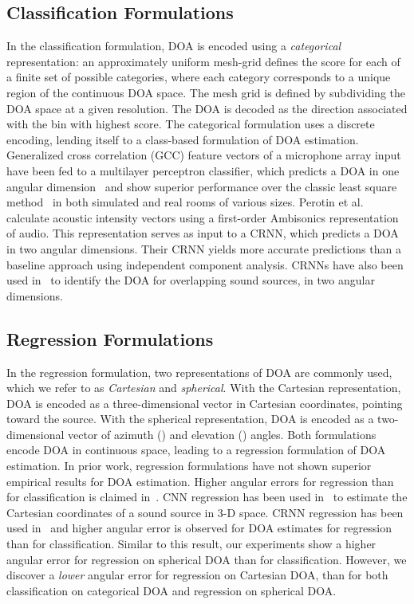 \documentclass[a4paper]{article}
\begin{document}
\subsection{Classification Formulations}


In the classification formulation, DOA is encoded using a \emph{categorical} representation: an approximately uniform mesh-grid defines the score for each of a finite set of possible categories, where each category corresponds to a unique region of the continuous DOA space. The mesh grid is defined by subdividing the DOA space at a given resolution. The DOA is decoded as the direction associated with the bin with highest score. The categorical formulation uses a discrete encoding, lending itself to a class-based formulation of DOA estimation. Generalized cross correlation (GCC) feature vectors of a microphone array input have been fed to a multilayer perceptron classifier, which predicts a DOA in one angular dimension~\cite{xiao2015learning} and show superior performance over the classic least square method~\cite{huang2001ls} in both simulated and real rooms of various sizes. Perotin et al.~\cite{perotin2018crnn} calculate acoustic intensity vectors using a first-order Ambisonics representation of audio. This representation serves as input to a CRNN, which predicts a DOA in two angular dimensions. Their CRNN yields more accurate predictions than a baseline approach using independent component analysis. CRNNs have also been used in~\cite{adavanne2018sound} to identify the DOA for overlapping sound sources, in two angular dimensions.

\subsection{Regression Formulations}


In the regression formulation, two representations of DOA are commonly used, which we refer to as \emph{Cartesian} and \emph{spherical}. With the Cartesian representation, DOA is encoded as a three-dimensional vector in Cartesian  coordinates, pointing toward the source. With the spherical representation, DOA is encoded as a two-dimensional vector of azimuth () and elevation () angles. Both formulations encode DOA in continuous space, leading to a regression formulation of DOA estimation. In prior work, regression formulations have not shown superior empirical results for DOA estimation. Higher angular errors for regression than for classification is claimed in~\cite{xiao2015learning}. CNN regression has been used in~\cite{veradiaz2018CNN} to estimate the Cartesian coordinates of a sound source in 3-D space. CRNN regression has been used in~\cite{adavanne2018sound} and higher angular error is observed for DOA estimates for regression than for classification. Similar to this result, our experiments show a higher angular error for regression on spherical DOA than for classification. However, we discover a \emph{lower} angular error for regression on Cartesian DOA, than for both classification on categorical DOA and regression on spherical DOA.
\end{document}
